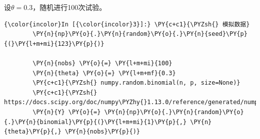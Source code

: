 设\(\theta = 0.3\)，随机进行100次试验。

    \begin{Verbatim}[commandchars=\\\{\}]
{\color{incolor}In [{\color{incolor}3}]:} \PY{c+c1}{\PYZsh{} 模拟数据}
        \PY{n}{np}\PY{o}{.}\PY{n}{random}\PY{o}{.}\PY{n}{seed}\PY{p}{(}\PY{l+m+mi}{123}\PY{p}{)}

        \PY{n}{nobs} \PY{o}{=} \PY{l+m+mi}{100}
        \PY{n}{theta} \PY{o}{=} \PY{l+m+mf}{0.3}
        \PY{c+c1}{\PYZsh{} numpy.random.binomial(n, p, size=None)}
        \PY{c+c1}{\PYZsh{} https://docs.scipy.org/doc/numpy\PYZhy{}1.13.0/reference/generated/numpy.random.binomial.html}
        \PY{n}{Y} \PY{o}{=} \PY{n}{np}\PY{o}{.}\PY{n}{random}\PY{o}{.}\PY{n}{binomial}\PY{p}{(}\PY{l+m+mi}{1}\PY{p}{,} \PY{n}{theta}\PY{p}{,} \PY{n}{nobs}\PY{p}{)}
\end{Verbatim}

